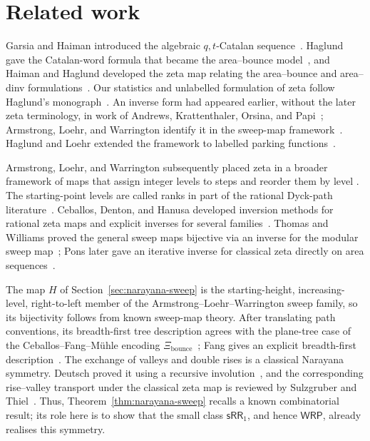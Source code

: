 \documentclass[11pt]{article}
\theoremstyle{definition}
\newcommand{\WRP}{\mathsf{WRP}}
\newcommand{\SWR}{\mathsf{sRR}_1}
\begin{document}
\section{Related work}\label{sec:discussion}\label{sec:related-work}

Garsia and Haiman introduced the algebraic $q,t$-Catalan
sequence~\cite{GarsiaHaiman1996}.  Haglund gave the Catalan-word formula that
became the area--bounce model~\cite{Haglund2003}, and Haiman and Haglund
developed the zeta map relating the area--bounce and area--dinv
formulations~\cite[Section~2]{ThomasWilliams2018}.  Our statistics and
unlabelled formulation of zeta follow Haglund's monograph~\cite{Haglund2008}.
An inverse form had appeared earlier, without the later zeta terminology, in
work of Andrews, Krattenthaler, Orsina, and Papi~\cite{AndrewsEtAl2002};
Armstrong, Loehr, and Warrington identify it in the sweep-map
framework~\cite{ArmstrongLoehrWarrington2015}.  Haglund and Loehr extended the
framework to labelled parking functions~\cite{HaglundLoehr2005}.

Armstrong, Loehr, and Warrington subsequently placed zeta in a broader
framework of maps that assign integer levels to steps and reorder them by level
\cite{ArmstrongLoehrWarrington2015,ArmstrongLoehrWarrington2016}.  The
starting-point levels are called ranks in part of the rational Dyck-path
literature~\cite{Xin2015}.  Ceballos, Denton, and Hanusa developed inversion
methods for rational zeta maps and explicit inverses for several
families~\cite{CeballosDentonHanusa2016}.  Thomas and Williams proved the
general sweep maps bijective via an inverse for the modular sweep
map~\cite{ThomasWilliams2018}; Pons later gave an iterative inverse for
classical zeta directly on area sequences~\cite{Pons2022}.

The map $H$ of Section~\ref{sec:narayana-sweep} is the starting-height,
increasing-level, right-to-left member of the Armstrong--Loehr--Warrington
sweep family, so its bijectivity follows from known sweep-map theory.  After
translating path conventions, its breadth-first tree description agrees with
the plane-tree case of the Ceballos--Fang--M\"uhle encoding
$\Xi_{\mathrm{bounce}}$~\cite{CeballosFangMuhle2020}; Fang gives an explicit
breadth-first description~\cite{Fang2024}.  The exchange of valleys and double
rises is a classical Narayana symmetry.  Deutsch proved it using a recursive
involution~\cite{Deutsch1999}, and the corresponding rise--valley transport
under the classical zeta map is reviewed by Sulzgruber and
Thiel~\cite[Section~2.8]{SulzgruberThiel2018}.  Thus,
Theorem~\ref{thm:narayana-sweep} recalls a known combinatorial result; its role
here is to show that the small class $\SWR$, and hence $\WRP$, already realises
this symmetry.
\end{document}
